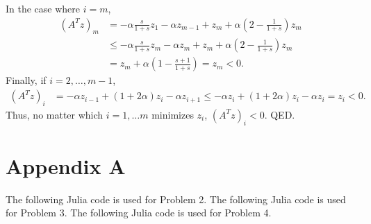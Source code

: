 \documentclass{article}
\begin{document}
In the case where $i=m$, 
\begin{align*}
(A^Tz)_m&=-\alpha\frac{s}{1+s}z_1-\alpha z_{m-1} +z_m+\alpha\left(2 - \frac{1}{1+s}\right)z_m\\&\leq
-\alpha\frac{s}{1+s}z_m-\alpha z_{m} +z_m+\alpha\left(2 - \frac{1}{1+s}\right)z_m\\&=
z_m+\alpha\left(1-\frac{s+1}{1+s}\right)=z_m<0.
\end{align*}
Finally, if $i=2,\ldots,m-1$,
\begin{align*}
(A^Tz)_i&=-\alpha z_{i-1}+(1+2\alpha)z_i-\alpha z_{i+1}\leq-\alpha z_{i}+(1+2\alpha)z_i-\alpha z_{i}=z_i<0.
\end{align*}
Thus, no matter which $i=1,\ldots m$ minimizes $z_i$, $(A^Tz)_i<0$. QED.


\section{Appendix A}
The following Julia code is used for Problem 2.
The following Julia code is used for Problem 3.
The following Julia code is used for Problem 4.
\end{document}

